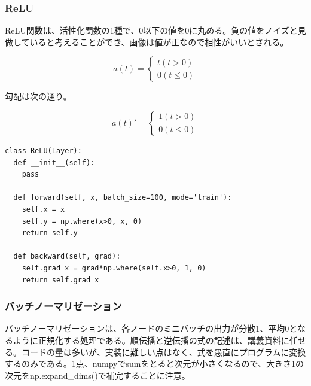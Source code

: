 \documentclass[platex,dvipdfmx]{jsarticle}
\begin{document}
\subsubsection{ReLU}

ReLU関数は、活性化関数の1種で、0以下の値を0に丸める。負の値をノイズと見做していると考えることができ、画像は値が正なので相性がいいとされる。

\[
  a(t) = \left\{ \begin{array}{l}
  t ( t > 0 ) \\
  0 ( t \leq 0 )
  \end{array} \right.
\]

勾配は次の通り。

\[
  a(t)' = \left\{ \begin{array}{l}
  1 ( t > 0 ) \\
  0 ( t \leq 0 )
  \end{array} \right.
\]

\begin{lstlisting}[caption=ex\_advanced.py, label=ReLU]
class ReLU(Layer):
  def __init__(self):
    pass

  def forward(self, x, batch_size=100, mode='train'):
    self.x = x
    self.y = np.where(x>0, x, 0)
    return self.y

  def backward(self, grad):
    self.grad_x = grad*np.where(self.x>0, 1, 0)
    return self.grad_x
\end{lstlisting}

\subsubsection{バッチノーマリゼーション}

バッチノーマリゼーションは、各ノードのミニバッチの出力が分散1、平均0となるように正規化する処理である。順伝播と逆伝播の式の記述は、講義資料に任せる。コードの量は多いが、実装に難しい点はなく、式を愚直にプログラムに変換するのみである。1点、numpyでsumをとると次元が小さくなるので、大きさ1の次元をnp.expand\_dims()で補完することに注意。
\end{document}
